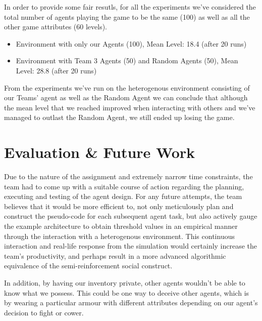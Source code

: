 In order to provide some fair resutls, for all the experiments we've considered the total number of agents playing the game to be the same (100) as well as all the other game attributes (60 levels).
\begin{itemize}
    \item Environment with only our Agents (100), Mean Level: 18.4 (after 20 runs)
    \item Environment with Team 3 Agents (50) and Random Agents (50), Mean Level: 28.8 (after 20 runs)
\end{itemize}

From the experiments we've run on the heterogenous environment consisting of our Teams' agent as well as the Random Agent we can conclude that although the mean level that we reached improved when interacting with others and we've managed to outlast the Random Agent, we still ended up losing the game.

\section{Evaluation \& Future Work}

Due to the nature of the assignment and extremely narrow time constraints, the team had to come up with a suitable course of action regarding the planning, executing and testing of the agent design. For any future attempts, the team believes that it would be more efficient to, not only meticulously plan and construct the pseudo-code for each subsequent agent task, but also actively gauge the example architecture to obtain threshold values in an empirical manner through the interaction with a heterogenous environment. This continuous interaction and real-life response from the simulation would certainly increase the team's productivity, and perhaps result in a more advanced algorithmic equivalence of the semi-reinforcement social construct.

In addition, by having our inventory private, other agents wouldn't be able to know what we possess. This could be one way to deceive other agents, which is by wearing a particular armour with different attributes depending on our agent's decision to fight or cower. 